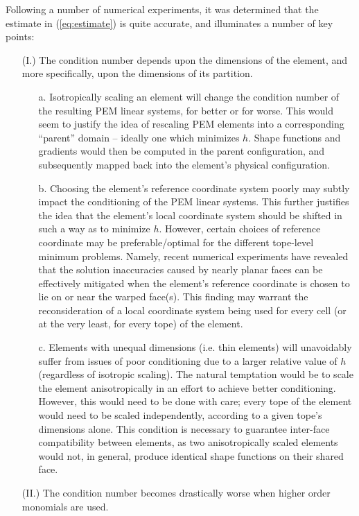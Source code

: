 Following a number of numerical experiments, it was determined that the estimate in (\ref{eq:estimate}) is quite accurate, and illuminates a number of key points:
\begin{itemize}
	\item[(I.)] The condition number depends upon the dimensions of the element, and more specifically, upon the dimensions of its partition.
	\begin{itemize}
		\item[a.] Isotropically scaling an element will change the condition number of the resulting PEM linear systems, for better or for worse. This would seem to justify the idea of rescaling PEM elements into a corresponding ``parent'' domain -- ideally one which minimizes $h$. Shape functions and gradients would then be computed in the parent configuration, and subsequently mapped back into the element's physical configuration.
		\item[b.] Choosing the element's reference coordinate system poorly may subtly impact the conditioning of the PEM linear systems. This further justifies the idea that the element's local coordinate system should be shifted in such a way as to minimize $h$. However, certain choices of reference coordinate may be preferable/optimal for the different tope-level minimum problems. Namely, recent numerical experiments have revealed that the solution inaccuracies caused by nearly planar faces can be effectively mitigated when the element's reference coordinate is chosen to lie on or near the warped face(s). This finding may warrant the reconsideration of a local coordinate system being used for every cell (or at the very least, for every tope) of the element.
		\item[c.] Elements with unequal dimensions (i.e. thin elements) will unavoidably suffer from issues of poor conditioning due to a larger relative value of $h$ (regardless of isotropic scaling). The natural temptation would be to scale the element anisotropically in an effort to achieve better conditioning. However, this would need to be done with care; every tope of the element would need to be scaled independently, according to a given tope's dimensions alone. This condition is necessary to guarantee inter-face compatibility between elements, as two anisotropically scaled elements would not, in general, produce identical shape functions on their shared face.
	\end{itemize}
	\item[(II.)] The condition number becomes drastically worse when higher order monomials are used.

\end{itemize}
